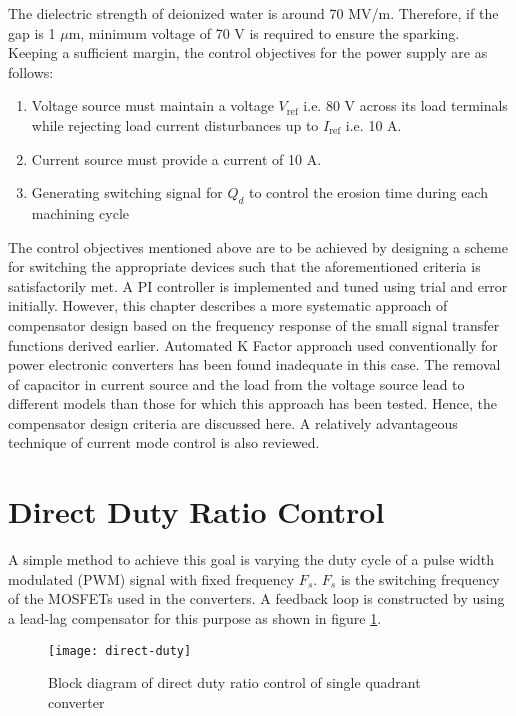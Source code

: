 \label{chap:lincontrol}
	The dielectric strength of deionized water is around 70 MV/m. Therefore, if the gap is 1 $\mu$m, minimum voltage of 70 V is required to ensure the sparking. Keeping a sufficient margin, the control objectives for the power supply are as follows:
	\begin{enumerate}
		\item Voltage source must maintain a voltage $V_{\text{ref}}$ i.e. 80 V across its load terminals while rejecting load current disturbances up to $I_{\text{ref}}$ i.e. 10 A.
		\item Current source must provide a current of 10 A.
		\item Generating switching signal for $Q_d$ to control the erosion time during each machining cycle 
	\end{enumerate}
	The control objectives mentioned above are to be achieved by designing a scheme for switching the appropriate devices such that the aforementioned criteria is satisfactorily met. A PI controller is implemented and tuned using trial and error initially. However, this chapter describes a more systematic approach of compensator design based on the frequency response of the small signal transfer functions derived earlier. Automated K Factor approach \cite{muhamad2005design} used conventionally for power electronic converters has been found inadequate in this case. The removal of capacitor in current source and the load from the voltage source lead to different models than those for which this approach has been tested. Hence, the compensator design criteria are discussed here. A relatively advantageous technique of current mode control is also reviewed.

\section{Direct Duty Ratio Control}
	 A simple method to achieve this goal is varying the duty cycle of a pulse width modulated (PWM) signal with fixed frequency $F_s$. $F_s$ is the switching frequency of the MOSFETs used in the converters. A feedback loop is constructed by using a lead-lag compensator for this purpose as shown in figure \ref{fig:dirduty-1}.

	\begin{figure}[h]
		\centering
		\texttt{[image: direct-duty]}
		\caption{Block diagram of direct duty ratio control of single quadrant converter}
		\label{fig:dirduty-1}
	\end{figure}

